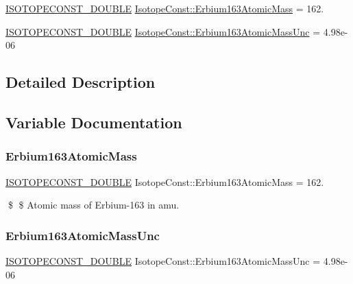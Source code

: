 \begin{DoxyCompactItemize}
\item 
\mbox{\hyperlink{group___isotope_const-_macros_ga8f45a7272ce02c0b4c65c44636ed719a}{I\+S\+O\+T\+O\+P\+E\+C\+O\+N\+S\+T\+\_\+\+D\+O\+U\+B\+LE}} \mbox{\hyperlink{group___isotope_const-_erbium-_er163_ga9426505f7f66b22596c82a113062357f}{Isotope\+Const\+::\+Erbium163\+Atomic\+Mass}} = 162.
\item 
\mbox{\hyperlink{group___isotope_const-_macros_ga8f45a7272ce02c0b4c65c44636ed719a}{I\+S\+O\+T\+O\+P\+E\+C\+O\+N\+S\+T\+\_\+\+D\+O\+U\+B\+LE}} \mbox{\hyperlink{group___isotope_const-_erbium-_er163_gae62b16b111ebee97c3027c5eb21d08ce}{Isotope\+Const\+::\+Erbium163\+Atomic\+Mass\+Unc}} = 4.\+98e-\/06
\end{DoxyCompactItemize}


\subsection{Detailed Description}


\subsection{Variable Documentation}
\mbox{\label{group___isotope_const-_erbium-_er163_ga9426505f7f66b22596c82a113062357f}} 
\subsubsection{\texorpdfstring{Erbium163\+Atomic\+Mass}{Erbium163AtomicMass}}
{\footnotesize\ttfamily \mbox{\hyperlink{group___isotope_const-_macros_ga8f45a7272ce02c0b4c65c44636ed719a}{I\+S\+O\+T\+O\+P\+E\+C\+O\+N\+S\+T\+\_\+\+D\+O\+U\+B\+LE}} Isotope\+Const\+::\+Erbium163\+Atomic\+Mass = 162.}

\$ \$ Atomic mass of Erbium-\/163 in amu. \mbox{\label{group___isotope_const-_erbium-_er163_gae62b16b111ebee97c3027c5eb21d08ce}} 
\subsubsection{\texorpdfstring{Erbium163\+Atomic\+Mass\+Unc}{Erbium163AtomicMassUnc}}
{\footnotesize\ttfamily \mbox{\hyperlink{group___isotope_const-_macros_ga8f45a7272ce02c0b4c65c44636ed719a}{I\+S\+O\+T\+O\+P\+E\+C\+O\+N\+S\+T\+\_\+\+D\+O\+U\+B\+LE}} Isotope\+Const\+::\+Erbium163\+Atomic\+Mass\+Unc = 4.\+98e-\/06}

